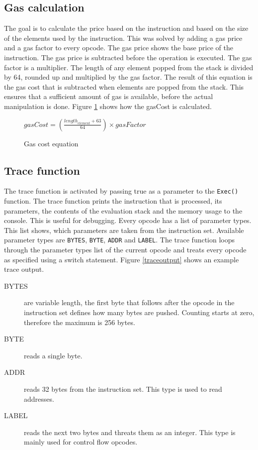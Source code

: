 \subsection{Gas calculation}
The goal is to calculate the price based on the instruction and based on the size of the elements used by the instruction. This was solved by adding a gas price and a gas factor to every opcode. The gas price shows the base price of the instruction. The gas price is subtracted before the operation is executed. The gas factor is a multiplier. The length of any element popped from the stack is divided by 64, rounded up and multiplied by the gas factor. The result of this equation is the gas cost that is subtracted when elements are popped from the stack. This ensures that a sufficient amount of gas is available, before the actual manipulation is done. Figure \ref{gas_factor_calc} shows how the gasCost is calculated.

\begin{figure}[thp]%
    	\centering
		$
		gasCost=\left( \frac { { length }_{ element }+63 }{ 64 }  \right) \times gasFactor
		$
		\caption{Gas cost equation}
		\label{gas_factor_calc}
\end{figure}

\subsection{Trace function}
The trace function is activated by passing true as a parameter to the \texttt{Exec()} function. The trace function prints the instruction that is processed, its parameters, the contents of the evaluation stack and the memory usage to the console. This is useful for debugging. Every opcode has a list of parameter types. This list shows, which parameters are taken from the instruction set. Available parameter types are \texttt{BYTES}, \texttt{BYTE}, \texttt{ADDR} and \texttt{LABEL}. The trace function loops through the parameter types list of the current opcode and treats every opcode as specified using a switch statement. Figure \ref{traceoutput} shows an example trace output.
\begin{description}
	\item[BYTES] are variable length, the first byte that follows after the opcode in the instruction set defines how many bytes are pushed. Counting starts at zero, therefore the maximum is 256 bytes.
	\item[BYTE] reads a single byte.
	\item[ADDR] reads 32 bytes from the instruction set. This type is used to read addresses.
	\item[LABEL] reads the next two bytes and threats them as an integer. This type is mainly used for control flow opcodes.
\end{description}

